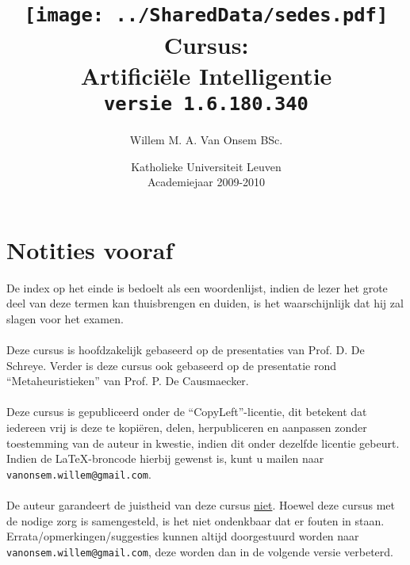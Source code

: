 \documentclass[titlepage,a4paper,openany,]{book}
\title{\texttt{[image: ../SharedData/sedes.pdf]}\\Cursus:\\Artifici\"ele Intelligentie\\\texttt{\small versie 1.6.180.340}}
\author{Willem M. A. Van Onsem BSc.}
\date{Katholieke Universiteit Leuven\\Academiejaar 2009-2010}
\begin{document}
\frontmatter
\begin{titlepage}
\maketitle
\end{titlepage}
\tableofcontents
\newpage
\chapter*{Notities vooraf}
\begin{it}
De index op het einde is bedoelt als een woordenlijst, indien de lezer het grote deel van deze termen kan thuisbrengen en duiden, is het waarschijnlijk dat hij zal slagen voor het examen.
\\\\
Deze cursus is hoofdzakelijk gebaseerd op de presentaties van Prof. D. De Schreye. Verder is deze cursus ook gebaseerd op de presentatie rond ``Metaheuristieken'' van Prof. P. De Causmaecker.
\\\\
Deze cursus is gepubliceerd onder de ``CopyLeft''-licentie, dit betekent dat iedereen vrij is deze te kopi\"eren, delen, herpubliceren en aanpassen zonder toestemming van de auteur in kwestie, indien dit onder dezelfde licentie gebeurt.\\ Indien de \LaTeX-broncode hierbij gewenst is, kunt u mailen naar {\tt vanonsem.willem@gmail.com}.
\\\\
De auteur garandeert de juistheid van deze cursus \underline{niet}. Hoewel deze cursus met de nodige zorg is samengesteld, is het niet ondenkbaar dat er fouten in staan. Errata/opmerkingen/suggesties kunnen altijd doorgestuurd worden naar {\tt vanonsem.willem@gmail.com}, deze worden dan in de volgende versie verbeterd.


\end{it}
\end{document}
